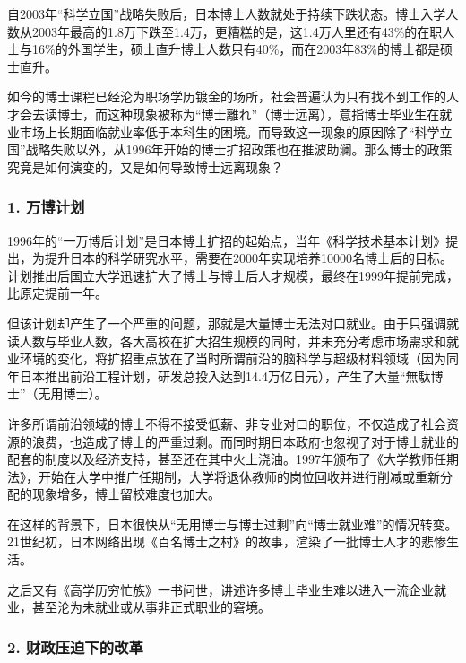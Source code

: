 {\fangsong 自2003年“科学立国”战略失败后，日本博士人数就处于持续下跌状态。博士入学人数从2003年最高的1.8万下跌至1.4万，更糟糕的是，这1.4万人里还有43\%的在职人士与16\%的外国学生，硕士直升博士人数只有40\%，而在2003年83\%的博士都是硕士直升。\par}

{\fangsong 如今的博士课程已经沦为职场学历镀金的场所，社会普遍认为只有找不到工作的人才会去读博士，而这种现象被称为“博士離れ”（博士远离），意指博士毕业生在就业市场上长期面临就业率低于本科生的困境。而导致这一现象的原因除了“科学立国”战略失败以外，从1996年开始的博士扩招政策也在推波助澜。那么博士的政策究竟是如何演变的，又是如何导致博士远离现象？\par}

\subsubsection{1. 万博计划}

{\fangsong 1996年的“一万博后计划”是日本博士扩招的起始点，当年《科学技术基本计划》提出，为提升日本的科学研究水平，需要在2000年实现培养10000名博士后的目标。计划推出后国立大学迅速扩大了博士与博士后人才规模，最终在1999年提前完成，比原定提前一年。\par}

{\fangsong 但该计划却产生了一个严重的问题，那就是大量博士无法对口就业。由于只强调就读人数与毕业人数，各大高校在扩大招生规模的同时，并未充分考虑市场需求和就业环境的变化，将扩招重点放在了当时所谓前沿的脑科学与超级材料领域（因为同年日本推出前沿工程计划，研发总投入达到14.4万亿日元），产生了大量“無駄博士”（无用博士）。\par}

{\fangsong 许多所谓前沿领域的博士不得不接受低薪、非专业对口的职位，不仅造成了社会资源的浪费，也造成了博士的严重过剩。而同时期日本政府也忽视了对于博士就业的配套的制度以及经济支持，甚至还在其中火上浇油。1997年颁布了《大学教师任期法》，开始在大学中推广任期制，大学将退休教师的岗位回收并进行削减或重新分配的现象增多，博士留校难度也加大。\par}

{\fangsong 在这样的背景下，日本很快从“无用博士与博士过剩”向“博士就业难”的情况转变。21世纪初，日本网络出现《百名博士之村》的故事，渲染了一批博士人才的悲惨生活。\par}

{\fangsong 之后又有《高学历穷忙族》一书问世，讲述许多博士毕业生难以进入一流企业就业，甚至沦为未就业或从事非正式职业的窘境。\par}

\subsubsection{2. 财政压迫下的改革}

